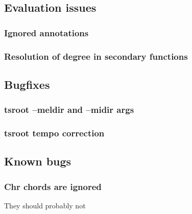 	\subsection{Evaluation issues}
		\subsubsection{Ignored annotations}
		\subsubsection{Resolution of degree in secondary functions}
	\subsection{Bugfixes}
		\subsubsection{tsroot --meldir and --midir args}
		\subsubsection{tsroot tempo correction}
	\subsection{Known bugs}
		\subsubsection{Chr chords are ignored}
    They should probably not

\newpage
